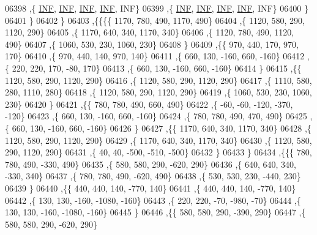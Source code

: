 \begin{DoxyCode}
06398     ,\{   \hyperlink{energy__const_8h_a12c2040f25d8e3a7b9e1c2024c618cb6}{INF},   \hyperlink{energy__const_8h_a12c2040f25d8e3a7b9e1c2024c618cb6}{INF},   \hyperlink{energy__const_8h_a12c2040f25d8e3a7b9e1c2024c618cb6}{INF},   \hyperlink{energy__const_8h_a12c2040f25d8e3a7b9e1c2024c618cb6}{INF},   INF\}
06399     ,\{   \hyperlink{energy__const_8h_a12c2040f25d8e3a7b9e1c2024c618cb6}{INF},   \hyperlink{energy__const_8h_a12c2040f25d8e3a7b9e1c2024c618cb6}{INF},   \hyperlink{energy__const_8h_a12c2040f25d8e3a7b9e1c2024c618cb6}{INF},   \hyperlink{energy__const_8h_a12c2040f25d8e3a7b9e1c2024c618cb6}{INF},   INF\}
06400     \}
06401    \}
06402   \}
06403  ,\{\{\{\{  1170,   780,   490,  1170,   490\}
06404     ,\{  1120,   580,   290,  1120,   290\}
06405     ,\{  1170,   640,   340,  1170,   340\}
06406     ,\{  1120,   780,   490,  1120,   490\}
06407     ,\{  1060,   530,   230,  1060,   230\}
06408     \}
06409    ,\{\{   970,   440,   170,   970,   170\}
06410     ,\{   970,   440,   140,   970,   140\}
06411     ,\{   660,   130,  -160,   660,  -160\}
06412     ,\{   220,   220,   170,   -80,   170\}
06413     ,\{   660,   130,  -160,   660,  -160\}
06414     \}
06415    ,\{\{  1120,   580,   290,  1120,   290\}
06416     ,\{  1120,   580,   290,  1120,   290\}
06417     ,\{  1110,   580,   280,  1110,   280\}
06418     ,\{  1120,   580,   290,  1120,   290\}
06419     ,\{  1060,   530,   230,  1060,   230\}
06420     \}
06421    ,\{\{   780,   780,   490,   660,   490\}
06422     ,\{   -60,   -60,  -120,  -370,  -120\}
06423     ,\{   660,   130,  -160,   660,  -160\}
06424     ,\{   780,   780,   490,   470,   490\}
06425     ,\{   660,   130,  -160,   660,  -160\}
06426     \}
06427    ,\{\{  1170,   640,   340,  1170,   340\}
06428     ,\{  1120,   580,   290,  1120,   290\}
06429     ,\{  1170,   640,   340,  1170,   340\}
06430     ,\{  1120,   580,   290,  1120,   290\}
06431     ,\{    40,    40,  -500,  -510,  -500\}
06432     \}
06433    \}
06434   ,\{\{\{   780,   780,   490,  -330,   490\}
06435     ,\{   580,   580,   290,  -620,   290\}
06436     ,\{   640,   640,   340,  -330,   340\}
06437     ,\{   780,   780,   490,  -620,   490\}
06438     ,\{   530,   530,   230,  -440,   230\}
06439     \}
06440    ,\{\{   440,   440,   140,  -770,   140\}
06441     ,\{   440,   440,   140,  -770,   140\}
06442     ,\{   130,   130,  -160, -1080,  -160\}
06443     ,\{   220,   220,   -70,  -980,   -70\}
06444     ,\{   130,   130,  -160, -1080,  -160\}
06445     \}
06446    ,\{\{   580,   580,   290,  -390,   290\}
06447     ,\{   580,   580,   290,  -620,   290\}

\end{DoxyCode}
